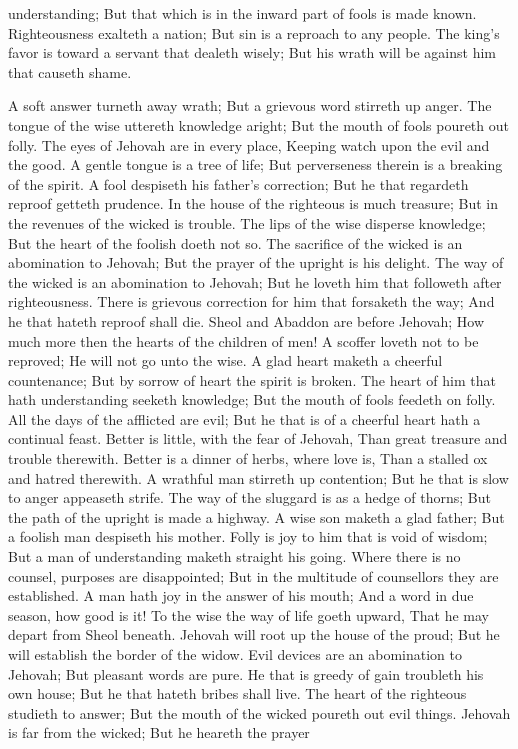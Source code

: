 understanding; But that which is in the inward part of fools is made known.  Righteousness exalteth a nation; But sin is a reproach to any people.  The king’s favor is toward a servant that dealeth wisely; But his wrath will be against him that causeth shame. 

A soft answer turneth away wrath; But a grievous word stirreth up anger.  The tongue of the wise uttereth knowledge aright; But the mouth of fools poureth out folly.  The eyes of Jehovah are in every place, Keeping watch upon the evil and the good.  A gentle tongue is a tree of life; But perverseness therein is a breaking of the spirit.  A fool despiseth his father’s correction; But he that regardeth reproof getteth prudence.  In the house of the righteous is much treasure; But in the revenues of the wicked is trouble.  The lips of the wise disperse knowledge; But the heart of the foolish doeth not so.  The sacrifice of the wicked is an abomination to Jehovah; But the prayer of the upright is his delight.  The way of the wicked is an abomination to Jehovah; But he loveth him that followeth after righteousness.  There is grievous correction for him that forsaketh the way; And he that hateth reproof shall die.  Sheol and Abaddon are before Jehovah; How much more then the hearts of the children of men!  A scoffer loveth not to be reproved; He will not go unto the wise.  A glad heart maketh a cheerful countenance; But by sorrow of heart the spirit is broken.  The heart of him that hath understanding seeketh knowledge; But the mouth of fools feedeth on folly.  All the days of the afflicted are evil; But he that is of a cheerful heart hath a continual feast.  Better is little, with the fear of Jehovah, Than great treasure and trouble therewith.  Better is a dinner of herbs, where love is, Than a stalled ox and hatred therewith.  A wrathful man stirreth up contention; But he that is slow to anger appeaseth strife.  The way of the sluggard is as a hedge of thorns; But the path of the upright is made a highway.  A wise son maketh a glad father; But a foolish man despiseth his mother.  Folly is joy to him that is void of wisdom; But a man of understanding maketh straight his going.  Where there is no counsel, purposes are disappointed; But in the multitude of counsellors they are established.  A man hath joy in the answer of his mouth; And a word in due season, how good is it!  To the wise the way of life goeth upward, That he may depart from Sheol beneath.  Jehovah will root up the house of the proud; But he will establish the border of the widow.  Evil devices are an abomination to Jehovah; But pleasant words are pure.  He that is greedy of gain troubleth his own house; But he that hateth bribes shall live.  The heart of the righteous studieth to answer; But the mouth of the wicked poureth out evil things.  Jehovah is far from the wicked; But he heareth the prayer 
